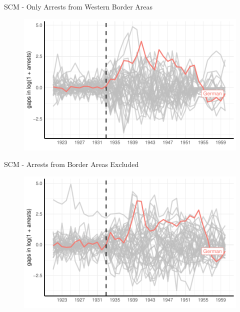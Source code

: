\documentclass[11pt]{beamer}
\begin{document}
\begin{frame}[label=sc_border_area_west]{SCM - Only Arrests from Western Border Areas}
 \begin{figure}[h]
\centering
\includegraphics[width=1\textwidth]{placebo_highlight_all_border_provinces_western.pdf}
\end{figure}
\hyperlink{add_content}{}
\end{frame}

\begin{frame}[label=sc_non_border_area]{SCM - Arrests from Border Areas Excluded}
 \begin{figure}[h]
\centering
\includegraphics[width=1\textwidth]{placebo_highlight_all_non_border_provinces.pdf}
\end{figure}
\hyperlink{sc_robustness_checks}{}
\end{frame}
\end{document}

